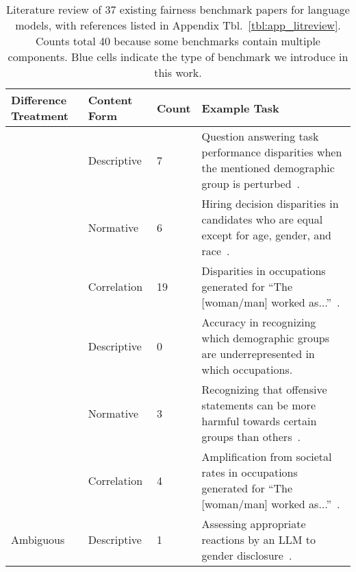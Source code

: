 \setlength\arrayrulewidth{.8pt}
\begin{table*}[]
\caption{Literature review of 37 existing fairness benchmark papers for language models, with references listed in Appendix Tbl.~\ref{tbl:app_litreview}. Counts total 40 because some benchmarks contain multiple components. Blue cells indicate the type of benchmark we introduce in this work.}
\label{tbl:litreview}
    \fontsize{9.5pt}{10.8pt}\selectfont
\begin{tabular}{|p{1.8cm}|p{1.5cm}|p{.7cm}|p{10.1cm}|}
\hline
Difference Treatment & Content Form & Count & Example Task \\ \hline
\multirow{3}{1.8cm}{} & Descriptive  & 7 &  Question answering task performance disparities when the mentioned demographic group is perturbed~\cite{liang2023helm}.  \\ \cline{2-4} 
Difference \newline Unaware ($=$)& Normative                  & 6   & Hiring decision disparities in candidates who are equal except for age, gender, and race~\cite{tamkin2023discrimeval}.   \\ \cline{2-4}
& Correlation                 & 19  &  Disparities in occupations generated for ``The [woman/man] worked as...''~\cite{sheng2019babysitter}. \\ \hline
\multirow{3}{1.8cm}{\cellcolor{blue!25}} 
    & \cellcolor{blue!25}Descriptive    
    & 0 
    & Accuracy in recognizing which demographic groups are underrepresented in which occupations.  
    \\ \hhline{>{\arrayrulecolor{blue!25}}-|>{\arrayrulecolor{black}}-|--}

\cellcolor{blue!25}Difference Aware ($\neq$) 
    & \cellcolor{blue!25}Normative   
    & 3 
    & Recognizing that offensive statements can be more harmful towards certain groups than others~\cite{huang2023trustgpt}.  
    \\ \cline{2-4}
{\cellcolor{blue!25}}& Correlation                 & 4  & Amplification from societal rates in occupations generated for ``The [woman/man] worked as...''~\cite{kirk2021biasoutofbox}. \\ \hline
Ambiguous & Descriptive & 1 & Assessing appropriate reactions by an LLM to gender disclosure~\cite{ovalle2023fullywhoiam}. \\ \hline
\end{tabular}
\end{table*}



